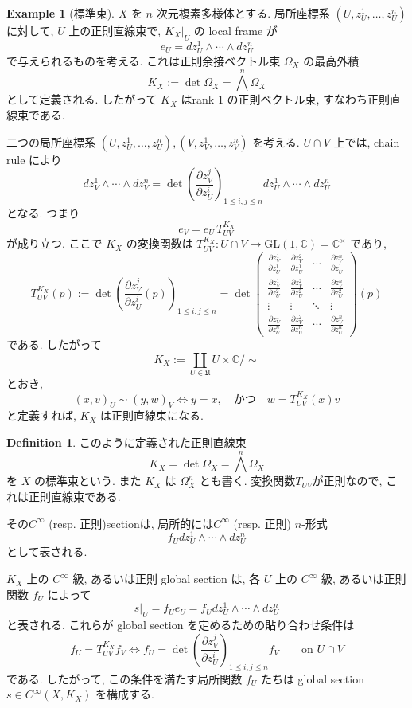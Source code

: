 \documentclass[dvipdfmx,a4paper,11pt]{article} %
\theoremstyle{definition}
\newtheorem{defn}[thm]{Definition}
\newtheorem{example}[thm]{Example}
\theoremstyle{remark}
\numberwithin{equation}{section}
\newcommand{\C}{\mathbb{C}}
\begin{document}
\begin{example}[標準束]
\(X\) を \(n\) 次元複素多様体とする. 局所座標系
\(
(U,z_U^1,\ldots,z_U^n)
\)
に対して, \(U\) 上の正則直線束で, \(K_X|_{U}\) の local frame が
\[
e_U
=
dz_U^1\wedge \cdots \wedge dz_U^n
\]
で与えられるものを考える. これは正則余接ベクトル束 \(\Omega_{X}\) の最高外積
\[
K_X:=\det \Omega_{X}=\bigwedge^n \Omega_{X}
\]
として定義される. したがって \(K_X\) はrank \(1\) の正則ベクトル束, すなわち正則直線束である.

二つの局所座標系
\(
(U,z_U^1,\ldots,z_U^n),(V,z_V^1,\ldots,z_V^n)
\)
を考える. \(U\cap V\) 上では, chain rule により
\begin{equation}
dz_V^1\wedge \cdots \wedge dz_V^n
=
\det
\left(
\frac{\partial z_V^j}{\partial z_U^i}
\right)_{1\leq i,j\leq n}
dz_U^1\wedge \cdots \wedge dz_U^n
\end{equation}
となる. つまり
\[
e_V
=
e_U\, T_{UV}^{K_X}
\]
が成り立つ. ここで \(K_X\) の変換関数は
\(
T_{UV}^{K_X}
\colon
U\cap V
\longrightarrow
\mathrm{GL}(1, \C)=
\mathbb{C}^{\times}
\)
であり,
\[
T_{UV}^{K_X}(p)
:=
\det
\left(
\frac{\partial z_V^j}{\partial z_U^i}(p)
\right)_{1\leq i,j\leq n}
=
\det
\begin{pmatrix}
\frac{\partial z_V^1}{\partial z_U^1}
& \frac{\partial z_V^2}{\partial z_U^1}
& \cdots
& \frac{\partial z_V^n}{\partial z_U^1}\\
\frac{\partial z_V^1}{\partial z_U^2}
& \frac{\partial z_V^2}{\partial z_U^2}
& \cdots
& \frac{\partial z_V^n}{\partial z_U^2}\\
\vdots & \vdots & \ddots & \vdots\\
\frac{\partial z_V^1}{\partial z_U^n}
& \frac{\partial z_V^2}{\partial z_U^n}
& \cdots
& \frac{\partial z_V^n}{\partial z_U^n}
\end{pmatrix}
(p)
\]
である. したがって
\[
K_X
:=
\coprod_{U\in\mathfrak{U}} U\times \mathbb{C}/\sim
\]
とおき,
\[
(x,v)_U\sim (y,w)_V
\Longleftrightarrow
y=x,\quad \text{かつ}\quad
w=T_{UV}^{K_X}(x)v
\]
と定義すれば, \(K_X\) は正則直線束になる.

\begin{defn}
このように定義された正則直線束
\[
K_X=\det \Omega_{X}=\bigwedge^n \Omega_{X}
\]
を \(X\) の標準束という. また \(K_X\) は \(\Omega_X^n\) とも書く. 
変換関数$T_{UV}$が正則なので, これは正則直線束である. 

その$C^{\infty}$ (resp. 正則)sectionは, 局所的には$C^{\infty}$ (resp. 正則) \(n\)-形式
\[
f_U dz_U^1\wedge \cdots \wedge dz_U^n
\]
として表される.
\end{defn}

\(K_X\) 上の \(C^\infty\) 級, あるいは正則 global section は, 各 \(U\) 上の \(C^\infty\) 級, あるいは正則関数 \(f_U\) によって
\[
s|_{U}
=
f_U e_U
=
f_U dz_U^1\wedge \cdots \wedge dz_U^n
\]
と表される. これらが global section を定めるための貼り合わせ条件は
\[
f_U
=
T_{UV}^{K_X} f_V
\Leftrightarrow
f_U
=
\det
\left(
\frac{\partial z_V^j}{\partial z_U^i}
\right)_{1\leq i,j\leq n}
f_V
\qquad
\text{on } U\cap V
\]
である. したがって, この条件を満たす局所関数 \(f_U\) たちは global section
\(
s\in C^\infty(X,K_X)
\)
を構成する.
\end{example}
\end{document}
